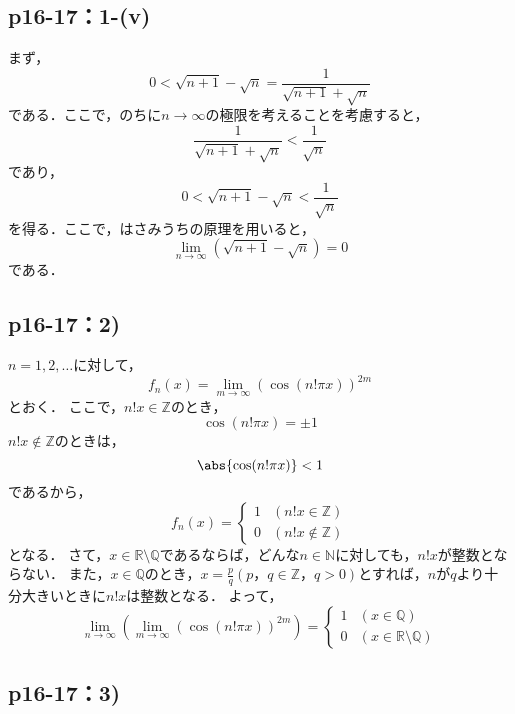 \documentclass[a4paper,10pt,fleqn]{ltjsarticle}
\begin{document}
\subsection*{p16-17：1-(v)}
\begin{tleftbar}
    まず，
    \[
       0<\sqrt{n+1} - \sqrt{n} = \frac{1}{\sqrt{n+1} + \sqrt{n}}
    \]
    である．ここで，のちに$n \to \infty$の極限を考えることを考慮すると，
    \[
    \frac{1}{\sqrt{n+1} + \sqrt{n}} < \frac{1}{\sqrt{n}} 
    \]
    であり，
    \[
        0< \sqrt{n+1} - \sqrt{n} <\frac{1}{\sqrt{n}}
    \]
    を得る．ここで，はさみうちの原理を用いると，
    \[
        \lim_{n \to \infty} (\sqrt{n+1} - \sqrt{n} )=0
    \]
    である．
\end{tleftbar}

\subsection*{p16-17：2)}

$n=1,2,\ldots$に対して，
\[
	f_{n} (x)=\lim_{m \to \infty} (\cos (n! \pi x)) ^{2m}
\]
とおく．
ここで，$n!x \in \mathbb{Z}$のとき，
\[
	\cos (n! \pi x)=\pm 1
\]
$n!x \notin \mathbb{Z}$のときは，
\[
	\abs{\cos (n! \pi x)}<1
\]
であるから，
\[
	f_{n} (x)=
	\begin{cases}
		1 &(n!x \in \mathbb{Z}) \\
		0 & (n!x \notin \mathbb{Z})
	\end{cases}
\]
となる．
さて，$x \in \mathbb{R} \setminus \mathbb{Q}$であるならば，どんな$n \in \mathbb{N}$に対しても，$n! x$が整数とならない．
また，$x \in \mathbb{Q}$のとき，$ x=\frac{p}{q}(p，q \in \mathbb{Z}，q>0)$とすれば，$n$が$q$より十分大きいときに$n!x$は整数となる．
よって，
\[
	\lim_{n \to \infty} \left( \lim_{m \to \infty} (\cos (n! \pi x)) ^{2m} \right)=
	\begin{cases}
		1 &(x \in \mathbb{Q}) \\
		0 & (x \in \mathbb{R} \setminus \mathbb{Q})
	\end{cases}
\]


\subsection*{p16-17：3)}

\end{document}

